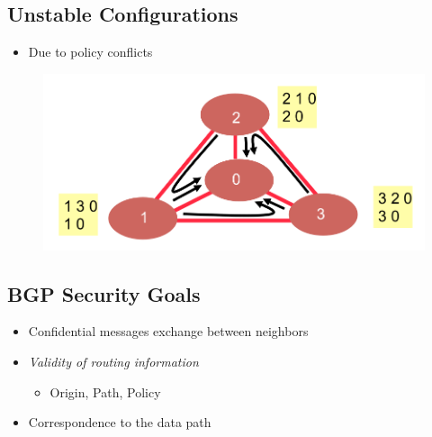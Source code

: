\subsection{Unstable Configurations}
\begin{itemize}
    \item Due to policy conflicts
\end{itemize}
\begin{figure}[H]
    \includegraphics[scale=0.25]{lazy/unstableconfigurations.png}
\end{figure}

\subsection{BGP Security Goals}
\begin{itemize}
    \item Confidential messages exchange between neighbors
    \item \emph{Validity of routing information}
          \begin{itemize}
              \item Origin, Path, Policy
          \end{itemize}
    \item Correspondence to the data path
\end{itemize}

